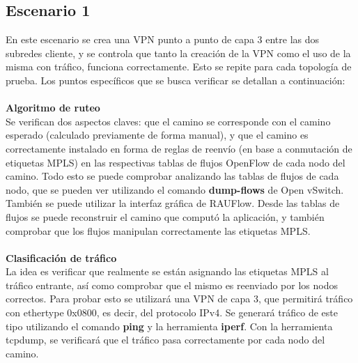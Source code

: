 \subsection{Escenario 1}
En este escenario se crea una VPN punto a punto de capa 3 entre las dos subredes cliente, y se controla que tanto la creación de la VPN como el uso de la misma con tráfico, funciona correctamente. Esto se repite para cada topología de prueba. Los puntos específicos que se busca verificar se detallan a continuación: \\ \\
\textbf{Algoritmo de ruteo} \\
 Se verifican dos aspectos claves: que el camino se corresponde con el camino esperado (calculado previamente de forma manual), y que el camino es correctamente instalado en forma de reglas de reenvío (en base a conmutación de etiquetas MPLS) en las respectivas tablas de flujos OpenFlow de cada nodo del camino. Todo esto se puede comprobar analizando las tablas de flujos de cada nodo, que se pueden ver utilizando el comando \textbf{dump-flows} de Open vSwitch. También se puede utilizar la interfaz gráfica de RAUFlow. Desde las tablas de flujos se puede reconstruir el camino que computó la aplicación, y también comprobar que los flujos manipulan correctamente las etiquetas MPLS. \\ \\
\textbf{Clasificación de tráfico} \\
La idea es verificar que realmente se están asignando las etiquetas MPLS al tráfico entrante, así como comprobar que el mismo es reenviado por los nodos correctos. Para probar esto se utilizará una VPN de capa 3, que permitirá tráfico con ethertype 0x0800, es decir, del protocolo IPv4. Se generará tráfico de este tipo utilizando el comando \textbf{ping} y la herramienta \textbf{iperf}. Con la herramienta tcpdump, se verificará que el tráfico pasa correctamente por cada nodo del camino. \\

\begin{table}[ht]
	\caption{Pasos que cumple cada caso en la creación y uso exitoso de un servicio.}
	\centering 
	\label{table:problemas_por_topologia}
\end{table}

